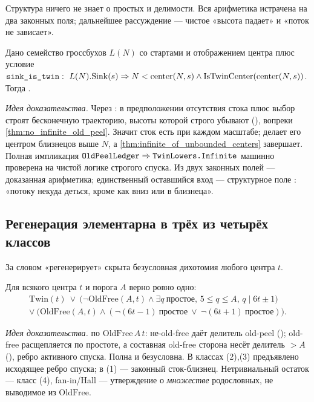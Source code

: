 Структура ничего не знает о простых и делимости. Вся арифметика истрачена на два законных поля;
дальнейшее рассуждение --- чистое «высота падает» и «поток не зависает».

\begin{theorem}\label{thm:twin_primes_of_nopsl}
Дано семейство гроссбухов $L(N)$ со стартами и отображением центра плюс условие
$\code{sink\_is\_twin}:\ L(N).\mathrm{Sink}(s)\Rightarrow N<\mathrm{center}(N,s)\wedge
\mathrm{IsTwinCenter}(\mathrm{center}(N,s))$. Тогда .
\end{theorem}

\emph{Идея доказательства.} Через : в предположении отсутствия стока
 плюс выбор строят бесконечную траекторию, высоты которой строго убывают
(), вопреки \cref{thm:no_infinite_old_peel}. Значит сток есть при каждом масштабе;
 делает его центром близнецов выше $N$, а
\cref{thm:infinite_of_unbounded_centers} завершает. \green{} Полная импликация
$\texttt{OldPeelLedger}\Rightarrow\texttt{TwinLowers.Infinite}$ машинно проверена на чистой логике
строгого спуска. Из двух законных полей  --- доказанная арифметика; единственный
оставшийся вход --- структурное поле : «потоку некуда деться, кроме как вниз или в
близнеца».

\subsection{Регенерация элементарна в трёх из четырёх классов}

За словом «регенерирует» скрыта безусловная дихотомия любого центра $t$.

\begin{theorem}\label{thm:regeneration_dichotomy}
Для всякого центра $t$ и порога $A$ верно ровно одно:
\[
\begin{gathered}
\mathrm{Twin}(t)\ \lor\ \bigl(\neg\mathrm{OldFree}(A,t)\wedge\exists q\ \text{простое},\,5\le q\le A,\,q\mid 6t\pm1\bigr)\\
\lor\ \bigl(\mathrm{OldFree}(A,t)\wedge(\neg(6t-1)\ \text{простое}\ \lor\ \neg(6t+1)\ \text{простое})\bigr).
\end{gathered}
\]
\end{theorem}

\emph{Идея доказательства.}  по $\mathrm{OldFree}\,A\,t$: не-old-free даёт делитель
old-peel (); old-free расщепляется по простоте, а составная old-free
сторона несёт делитель $>A$ (), ребро активного спуска.
\green{} Полна и безусловна. В классах (2),(3) предъявлено исходящее ребро спуска; в (1) --- законный
сток-близнец. Нетривиальный остаток --- класс (4), fan-in/Hall --- утверждение о \emph{множестве}
родословных, не выводимое из $\mathrm{OldFree}$.

